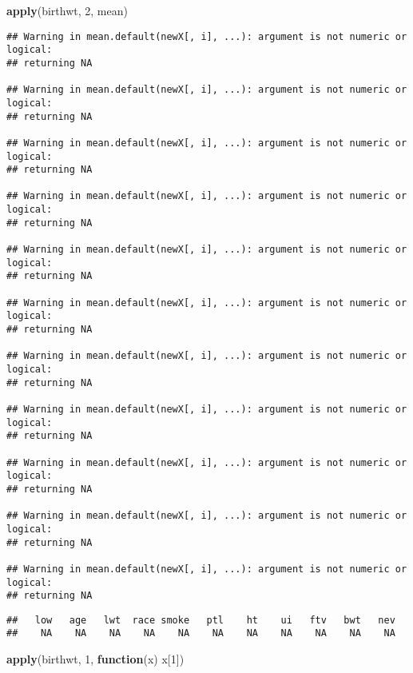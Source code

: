 \documentclass[]{book}
\newenvironment{Shaded}{\begin{snugshade}}{\end{snugshade}}
\newcommand{\ControlFlowTok}[1]{\textcolor[rgb]{0.13,0.29,0.53}{\textbf{#1}}}
\newcommand{\DecValTok}[1]{\textcolor[rgb]{0.00,0.00,0.81}{#1}}
\newcommand{\KeywordTok}[1]{\textcolor[rgb]{0.13,0.29,0.53}{\textbf{#1}}}
\newcommand{\NormalTok}[1]{#1}
\begin{document}
\begin{Shaded}
\begin{Highlighting}[]
\KeywordTok{apply}\NormalTok{(birthwt, }\DecValTok{2}\NormalTok{, mean)}
\end{Highlighting}
\end{Shaded}

\begin{verbatim}
## Warning in mean.default(newX[, i], ...): argument is not numeric or logical:
## returning NA

## Warning in mean.default(newX[, i], ...): argument is not numeric or logical:
## returning NA

## Warning in mean.default(newX[, i], ...): argument is not numeric or logical:
## returning NA

## Warning in mean.default(newX[, i], ...): argument is not numeric or logical:
## returning NA

## Warning in mean.default(newX[, i], ...): argument is not numeric or logical:
## returning NA

## Warning in mean.default(newX[, i], ...): argument is not numeric or logical:
## returning NA

## Warning in mean.default(newX[, i], ...): argument is not numeric or logical:
## returning NA

## Warning in mean.default(newX[, i], ...): argument is not numeric or logical:
## returning NA

## Warning in mean.default(newX[, i], ...): argument is not numeric or logical:
## returning NA

## Warning in mean.default(newX[, i], ...): argument is not numeric or logical:
## returning NA

## Warning in mean.default(newX[, i], ...): argument is not numeric or logical:
## returning NA
\end{verbatim}

\begin{verbatim}
##   low   age   lwt  race smoke   ptl    ht    ui   ftv   bwt   nev 
##    NA    NA    NA    NA    NA    NA    NA    NA    NA    NA    NA
\end{verbatim}

\begin{Shaded}
\begin{Highlighting}[]
\KeywordTok{apply}\NormalTok{(birthwt, }\DecValTok{1}\NormalTok{, }\ControlFlowTok{function}\NormalTok{(x) x[}\DecValTok{1}\NormalTok{])}
\end{Highlighting}
\end{Shaded}
\end{document}
